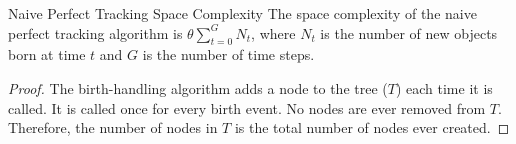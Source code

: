\begin{theorem}{Naive Perfect Tracking Space Complexity}
\label{thm:perfect-tracking-space}
The space complexity of the naive perfect tracking algorithm is $\mathcal{\theta}\sum_{t=0}^{G} N_t$, where $N_t$ is the number of new objects born at time $t$ and $G$ is the number of time steps.
\end{theorem}

\begin{proof}
\label{prf:perfect-tracking-space}
The birth-handling algorithm adds a node to the tree ($T$) each time it is called.
It is called once for every birth event.
No nodes are ever removed from $T$.
Therefore, the number of nodes in $T$ is the total number of nodes ever created.
\end{proof}
